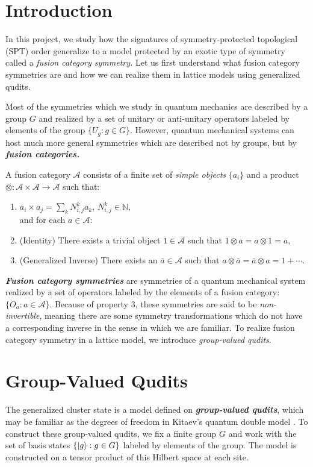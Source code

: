 \section{Introduction}
In this project, we study how the signatures of symmetry-protected topological (SPT) order generalize to a model protected by an exotic type of symmetry called a \textit{fusion category symmetry.} Let us first understand what fusion category symmetries are and how we can realize them in lattice models using generalized qudits.

Most of the symmetries which we study in quantum mechanics are described by a group $G$ and realized by a set of unitary or anti-unitary operators labeled by elements of the group $\{U_g:g\in G\}$. However, quantum mechanical systems can host much more general symmetries which are described not by groups, but by \textit{\textbf{fusion categories.}} 
\begin{definition}
    A fusion category $\mathcal{A}$ consists of a finite set of \textit{simple objects} $\{a_i\}$ and a product $\otimes:\mathcal{A}\times\mathcal{A}\rightarrow\mathcal{A}$ such that:
    \begin{enumerate}
        \item $a_i\times a_j=\sum_k N^{k}_{i,j} a_k$, $N_{i,j}^k\in\mathbb{N},$ \\and for each $a\in \mathcal{A}$:
        \item (Identity) There exists a trivial object $1\in\mathcal{A}$ such that $1\otimes a=a\otimes 1=a$,
        \item (Generalized Inverse) There exists an $\bar a\in\mathcal{A}$ such that $a\otimes\bar a=\bar a\otimes a=1+\cdots$.
    \end{enumerate}
\end{definition}
\textit{\textbf{Fusion category symmetries}} are symmetries of a quantum mechanical system realized by a set of operators labeled by the elements of a fusion category: $\{O_a:a\in\mathcal{A}\}$. Because of property 3, these symmetries are said to be \textit{non-invertible}, meaning there are some symmetry transformations which do not have a corresponding inverse in the sense in which we are familiar. To realize fusion category symmetry in a lattice model, we introduce \textit{group-valued qudits}.

\section{Group-Valued Qudits}
The generalized cluster state is a model defined on \textbf{\textit{group-valued qudits}}, which may be familiar as the degrees of freedom in Kitaev's quantum double model \cite{kitaev_fault-tolerant_2003-2}. To construct these group-valued qudits, we fix a finite group $G$ and work with the set of basis states
$\{\ket{g}:g\in G\}$
labeled by elements of the group. The model is constructed on a tensor product of this Hilbert space at each site. 

